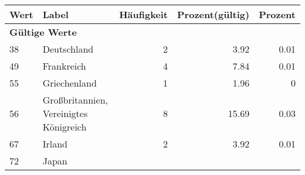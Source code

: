      \begin{longtable}{lXrrr}
     \toprule
     \textbf{Wert} & \textbf{Label} & \textbf{Häufigkeit} & \textbf{Prozent(gültig)} & \textbf{Prozent} \\
     \endhead
     \midrule
     \multicolumn{5}{l}{\textbf{Gültige Werte}}\\

     38 &
     \multicolumn{1}{X}{ Deutschland   } &


       \num{2} &
       \num[round-mode=places,round-precision=2]{3,92} &
         \num[round-mode=places,round-precision=2]{0,01} \\

     49 &
     \multicolumn{1}{X}{ Frankreich   } &


       \num{4} &
       \num[round-mode=places,round-precision=2]{7,84} &
         \num[round-mode=places,round-precision=2]{0,01} \\

     55 &
     \multicolumn{1}{X}{ Griechenland   } &


       \num{1} &
       \num[round-mode=places,round-precision=2]{1,96} &
         \num[round-mode=places,round-precision=2]{0} \\

     56 &
     \multicolumn{1}{X}{ Großbritannien, Vereinigtes Königreich   } &


       \num{8} &
       \num[round-mode=places,round-precision=2]{15,69} &
         \num[round-mode=places,round-precision=2]{0,03} \\

     67 &
     \multicolumn{1}{X}{ Irland   } &


       \num{2} &
       \num[round-mode=places,round-precision=2]{3,92} &
         \num[round-mode=places,round-precision=2]{0,01} \\

     72 &
     \multicolumn{1}{X}{ Japan   } &



\end{longtable}
